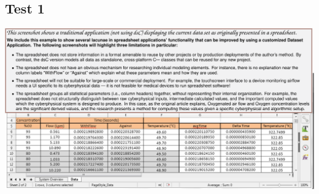 

\begin{frame}[t]{}
\section{Test 1}
\hspace*{-2cm}\includegraphics[page=1,width=1.2\textwidth]{Group_1-1-OriginalSpreadsheet.pdf}
\end{frame}

